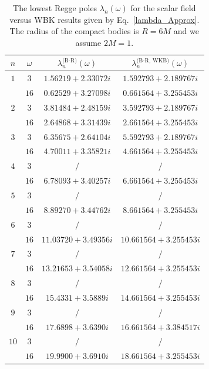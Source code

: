 \documentclass[aps,prd,longbibliography,reprint,twocolumn,amsmath,amssymb,amsfonts,showpacs,superscriptaddress]{revtex4-1}%
\begin{document}
\begingroup
\squeezetable
\begin{table}[htp]
\caption{\label{tab:table3} The lowest Regge poles $\lambda_{n}(\omega)$ for the scalar field versus WBK results given by Eq.~\eqref{lambda_Approx}. The radius of the compact bodies is $R = 6M$ and we assume $2M=1$.}
\smallskip
\centering
\begin{ruledtabular}
\begin{tabular}{cccc}
 $n$ & $\omega$  & $\lambda^{\text{(B-R)}}_n(\omega)$ & $\lambda^{\text{(B-R, WKB)}}_n(\omega)$
 \\ \hline
$1$  & $3$  & $1.56219+2.33072 i$  & $1.592793+2.189767i$   \\
     & $16$ & $ 0.62529+3.27098 i$ & $0.661564+3.255453i $   \\

$2$  & $3$  & $3.81484+2.48159 i$  & $3.592793+2.189767i $    \\
     & $16$ & $2.64868+3.31439 i$  & $2.661564+3.255453i $    \\

$3$  & $3$  & $6.35675+2.64104 i$ & $5.592793+2.189767i $    \\
     & $16$ & $4.70011+3.35821 i$  & $4.661564+3.255453i $    \\

$4$  & $3$  & $/$  & $ / $   \\
     & $16$ & $6.78093+3.40257 i$  & $6.661564+3.255453i $  \\

$5$  & $3$  & $/$  & $/$     \\
     & $16$ & $8.89270+3.44762 i$  & $8.661564+3.255453i $   \\

$6$  & $3$  & $/$  & $/$    \\
     & $16$ & $11.03720+3.49356 i$ & $10.661564+3.255453i $ \\

$7$  & $3$  & $/$ & $/$     \\
     & $16$ & $13.21653+3.54058 i$  & $12.661564+3.255453i$ \\

$8$  & $3$ & $/$   & $/$     \\
     & $16$ & $15.4331+3.5889 i$  & $14.661564+3.255453i $  \\

$9$  & $3$ & $/$   & $/$   \\
     & $16$ & $17.6898+3.6390 i$  & $16.661564+3.384517i $   \\

$10$  & $3$  & $/$  & $/$   \\
     & $16$  & $19.9900+3.6910 i$  & $18.661564+3.255453i $  \\
\end{tabular}
\end{ruledtabular}
\end{table}
\endgroup
\end{document}
